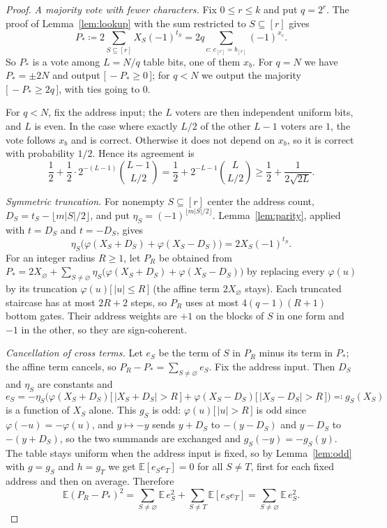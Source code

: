 \documentclass[11pt,letterpaper]{article}
\theoremstyle{remark}
\newcommand{\ind}[1]{\bigl[\,#1\,\bigr]}
\begin{document}
\begin{proof}
\emph{A majority vote with fewer characters.}
Fix $0\le r\le k$ and put $q=2^r$. The proof of Lemma~\ref{lem:lookup} with
the sum restricted to $S\subseteq[r]$ gives
\[
P_*\coloneqq2\sum_{S\subseteq[r]}X_S(-1)^{t_S}
 =2q\sum_{c:\,c_{[r]}=b_{[r]}}(-1)^{x_c}.
\]
So $P_*$ is a vote among $L=N/q$ table bits, one of them $x_b$. For $q=N$
we have $P_*=\pm2N$ and output $\ind{-P_*\ge0}$; for $q<N$ we output the
majority $\ind{-P_*\ge2q}$, with ties going to $0$.

For $q<N$, fix the address input; the $L$ voters are then independent
uniform bits, and $L$ is even. In the case where exactly $L/2$ of the other
$L-1$ voters are $1$, the vote follows $x_b$ and is correct. Otherwise it does
not depend on $x_b$, so it is correct with probability $1/2$. Hence its agreement is
\[
\frac12+\frac12\cdot2^{-(L-1)}\binom{L-1}{L/2}=\frac12+2^{-L-1}\binom{L}{L/2}
\ge\frac12+\frac1{2\sqrt{2L}}.
\]

\emph{Symmetric truncation.}
For nonempty $S\subseteq[r]$ center the address count,
$D_S=t_S-\lfloor m|S|/2\rfloor$, and put
$\eta_S=(-1)^{\lfloor m|S|/2\rfloor}$. Lemma~\ref{lem:parity}, applied with
$t=D_S$ and $t=-D_S$, gives
\[
\eta_S\bigl(\varphi(X_S+D_S)+\varphi(X_S-D_S)\bigr)=2X_S(-1)^{t_S}.
\]
For an integer radius $R\ge1$, let $P_R$ be obtained from
$P_*=2X_\varnothing+\sum_{S\ne\varnothing}\eta_S\bigl(\varphi(X_S+D_S)+\varphi(X_S-D_S)\bigr)$
by replacing every $\varphi(u)$ by its truncation $\varphi(u)\ind{|u|\le R}$
(the affine term $2X_\varnothing$ stays). Each truncated staircase has at most
$2R+2$ steps, so $P_R$ uses at most $4(q-1)(R+1)$ bottom gates. Their
address weights are $+1$ on the blocks of $S$ in one form and $-1$ in the
other, so they are sign-coherent.

\emph{Cancellation of cross terms.}
Let $e_S$ be the term of $S$ in $P_R$ minus its term in $P_*$; the affine term
cancels, so $P_R-P_*=\sum_{S\ne\varnothing}e_S$. Fix the address input. Then
$D_S$ and $\eta_S$ are constants and
\[
e_S=-\eta_S\bigl(\varphi(X_S+D_S)\ind{|X_S+D_S|>R}+\varphi(X_S-D_S)\ind{|X_S-D_S|>R}\bigr)
\eqqcolon g_S(X_S)
\]
is a function of $X_S$ alone. This $g_S$ is odd: $\varphi(u)\ind{|u|>R}$ is odd
since $\varphi(-u)=-\varphi(u)$, and $y\mapsto-y$ sends $y+D_S$ to $-(y-D_S)$
and $y-D_S$ to $-(y+D_S)$, so the two summands are exchanged and
$g_S(-y)=-g_S(y)$. The table stays uniform when the address input is fixed,
so by Lemma~\ref{lem:odd} with $g=g_S$ and $h=g_T$ we get
$\mathbb E[e_Se_T]=0$ for all $S\ne T$, first for each fixed address and then
on average. Therefore
\[
\mathbb E(P_R-P_*)^2=\sum_{S\ne\varnothing}\mathbb E\,e_S^2
+\sum_{S\ne T}\mathbb E[e_Se_T]=\sum_{S\ne\varnothing}\mathbb E\,e_S^2 .
\]


\end{proof}
\end{document}
